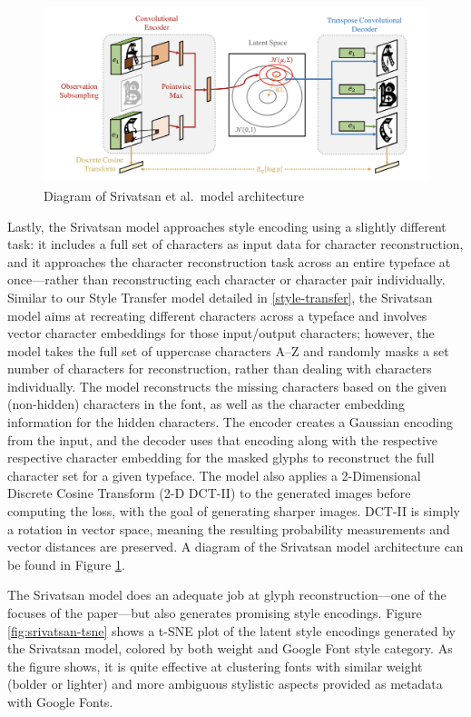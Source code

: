 \begin{figure}[h]
    \centering
    \includegraphics[width=\textwidth]{images/srivatsan-model.png}
    \caption{Diagram of Srivatsan et al.\ model architecture}
    \label{fig:srivatsan-model-2}
\end{figure}

Lastly, the Srivatsan model approaches style encoding using a slightly different task: it includes a full set of characters as input data for character reconstruction, and it approaches the character reconstruction task across an entire typeface at once---rather than reconstructing each character or character pair individually. Similar to our Style Transfer model detailed in \ref{style-transfer}, the Srivatsan model aims at recreating different characters across a typeface and involves vector character embeddings for those input/output characters; however, the model takes the full set of uppercase characters A--Z and randomly masks a set number of characters for reconstruction, rather than dealing with characters individually. The model reconstructs the missing characters based on the given (non-hidden) characters in the font, as well as the character embedding information for the hidden characters. The encoder creates a Gaussian encoding from the input, and the decoder uses that encoding along with the respective respective character embedding for the masked glyphs to reconstruct the full character set for a given typeface. The model also applies a 2-Dimensional Discrete Cosine Transform (2-D DCT-II) \cite{ahmed1974} to the generated images before computing the loss, with the goal of generating sharper images. DCT-II is simply a rotation in vector space, meaning the resulting probability measurements and vector distances are preserved. A diagram of the Srivatsan model architecture can be found in Figure \ref{fig:srivatsan-model-2}.
 
The Srivatsan model does an adequate job at glyph reconstruction---one of the focuses of the paper---but also generates promising style encodings. Figure \ref{fig:srivatsan-tsne} shows a t-SNE \cite{vandermaaten2008} plot of the latent style encodings generated by the Srivatsan model, colored by both weight and Google Font style category. As the figure shows, it is quite effective at clustering fonts with similar weight (bolder or lighter) and more ambiguous stylistic aspects provided as metadata with Google Fonts.

